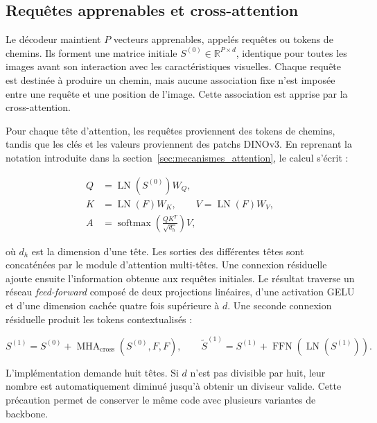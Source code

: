 \documentclass[12pt, a4paper, oneside]{report}
\begin{document}
\subsection{Requêtes apprenables et cross-attention}

Le décodeur maintient $P$ vecteurs apprenables, appelés requêtes ou tokens de chemins. Ils forment une matrice initiale $S^{(0)} \in \mathbb{R}^{P \times d}$, identique pour toutes les images avant son interaction avec les caractéristiques visuelles. Chaque requête est destinée à produire un chemin, mais aucune association fixe n'est imposée entre une requête et une position de l'image. Cette association est apprise par la cross-attention.

Pour chaque tête d'attention, les requêtes proviennent des tokens de chemins, tandis que les clés et les valeurs proviennent des patchs DINOv3. En reprenant la notation introduite dans la section~\ref{sec:mecanismes_attention}, le calcul s'écrit :

\begin{align}
    Q &= \operatorname{LN}\!\left(S^{(0)}\right)W_Q, \\
    K &= \operatorname{LN}(F)W_K, \qquad
    V = \operatorname{LN}(F)W_V, \\
    A &= \operatorname{softmax}\!\left(\frac{QK^{T}}{\sqrt{d_h}}\right)V,
    \label{eq:cross_attention_approche}
\end{align}

où $d_h$ est la dimension d'une tête. Les sorties des différentes têtes sont concaténées par le module d'attention multi-têtes. Une connexion résiduelle ajoute ensuite l'information obtenue aux requêtes initiales. Le résultat traverse un réseau \textit{feed-forward} composé de deux projections linéaires, d'une activation GELU et d'une dimension cachée quatre fois supérieure à $d$. Une seconde connexion résiduelle produit les tokens contextualisés :

\begin{equation}
    S^{(1)} = S^{(0)} + \operatorname{MHA}_{\mathrm{cross}}(S^{(0)},F,F),
    \qquad
    \widetilde{S}^{(1)} = S^{(1)} + \operatorname{FFN}\!\left(\operatorname{LN}(S^{(1)})\right).
    \label{eq:bloc_cross_attention}
\end{equation}

L'implémentation demande huit têtes. Si $d$ n'est pas divisible par huit, leur nombre est automatiquement diminué jusqu'à obtenir un diviseur valide. Cette précaution permet de conserver le même code avec plusieurs variantes de backbone.
\end{document}

